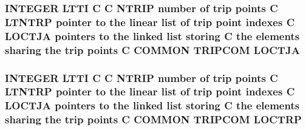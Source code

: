 \hypertarget{msa20_2home_2abonfi_2_c_f_d__codes_2_eul_f_s_83_82_83_2include_2trip_8com_a6b0b8b0dad59abf485e0f27ae437ea82}{
\subsubsection[{L\-O\-C\-T\-J\-A}]{\setlength{\rightskip}{0pt plus 5cm}I\-N\-T\-E\-G\-E\-R L\-T\-T\-I C C {\bf N\-T\-R\-I\-P} number of trip points C L\-T\-N\-T\-R\-P pointer to the linear list of trip point indexes C L\-O\-C\-T\-J\-A pointers to the linked list storing C the elements sharing the trip points C C\-O\-M\-M\-O\-N T\-R\-I\-P\-C\-O\-M L\-O\-C\-T\-J\-A}}\label{msa20_2home_2abonfi_2_c_f_d__codes_2_eul_f_s_83_82_83_2include_2trip_8com_a6b0b8b0dad59abf485e0f27ae437ea82}
\hypertarget{msa20_2home_2abonfi_2_c_f_d__codes_2_eul_f_s_83_82_83_2include_2trip_8com_a7338c756eee0f214801ca3c7c3b5f6ee}{
\subsubsection[{L\-O\-C\-T\-R\-P}]{\setlength{\rightskip}{0pt plus 5cm}I\-N\-T\-E\-G\-E\-R L\-T\-T\-I C C {\bf N\-T\-R\-I\-P} number of trip points C L\-T\-N\-T\-R\-P pointer to the linear list of trip point indexes C {\bf L\-O\-C\-T\-J\-A} pointers to the linked list storing C the elements sharing the trip points C C\-O\-M\-M\-O\-N T\-R\-I\-P\-C\-O\-M L\-O\-C\-T\-R\-P}}\label{msa20_2home_2abonfi_2_c_f_d__codes_2_eul_f_s_83_82_83_2include_2trip_8com_a7338c756eee0f214801ca3c7c3b5f6ee}
